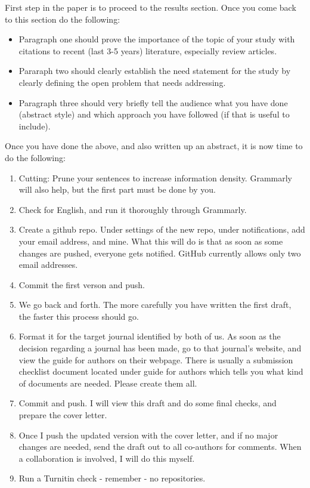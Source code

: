 \documentclass[12 pt]{article}
\begin{document}
First step in the paper is to proceed to the results section. Once you come back to this section do the following:

\begin{itemize}
\item Paragraph one should prove the importance of the topic of your study with citations to recent (last 3-5 years) literature, especially review articles.
\item Pararaph two should clearly establish the need statement for the study by clearly defining the open problem that needs addressing.
\item Paragraph three should very briefly tell the audience what you have done (abstract style) and which approach you have followed (if that is useful to include).
\end{itemize}

Once you have done the above, and also written up an abstract, it is now time to do the following:

\begin{enumerate}
\item Cutting: Prune your sentences to increase information density. Grammarly will also help, but the first part must be done by you.
\item Check for English\cite{burchfield:1998,strunk:2000}, and run it thoroughly through Grammarly.
\item Create a github repo. Under settings of the new repo, under notifications, add your email address, and mine. What this will do is that as soon as some changes are pushed, everyone gets notified. GitHub currently allows only two email addresses.
\item Commit the first verson and push.
\item We go back and forth. The more carefully you have written the first draft, the faster this process should go.
\item Format it for the target journal identified by both of us. As soon as the decision regarding a journal has been made, go to that journal's website, and view the guide for authors on their webpage. There is usually a submission checklist document located under guide for authors which tells you what kind of documents are needed. Please create them all.
\item Commit and push. I will view this draft and do some final checks, and prepare the cover letter.
\item Once I push the updated version with the cover letter, and if no major changes are needed, send the draft out to all co-authors for comments. When a collaboration is involved, I will do this myself.
\item Run a Turnitin check - remember - no repositories.
\end{enumerate}
\end{document}
